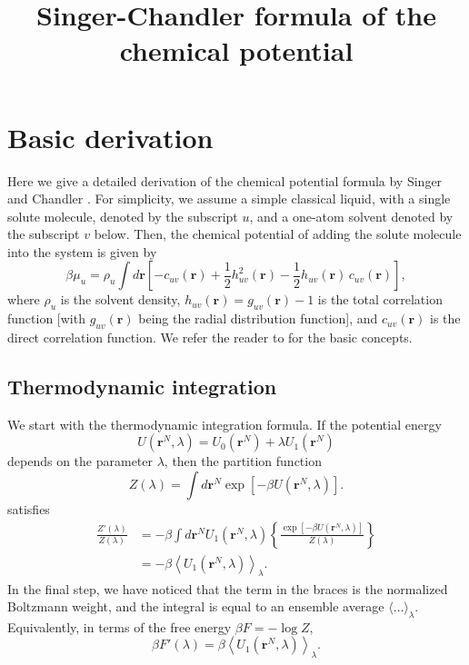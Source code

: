 \documentclass{article}
\begin{document}
\newcommand{\vct}[1]{\mathbf{#1}}
\newcommand{\vr}{\vct{r}}
\newcommand{\vrN}{\mathbf{r}^N}
\newcommand{\vrn}{\mathbf{r}^n}
\newcommand{\plam}{\partial_\lambda}



\title{Singer-Chandler formula of the chemical potential}
\date{}
\maketitle



\section{Basic derivation}

Here we give a detailed derivation of the chemical potential formula
  by Singer and Chandler \cite{singer}.
For simplicity, we assume a simple classical liquid,
  with a single solute molecule, denoted by the subscript $u$,
  and a one-atom solvent denoted by the subscript $v$ below.
Then, the chemical potential of adding the solute molecule into
  the system is given by
%
\begin{equation}
\beta \mu_u
  =
  \rho_u \int d\vr
  \left[
    - c_{uv}(\vr)
    + \frac{1}{2} h_{uv}^2(\vr)
    - \frac{1}{2} h_{uv}(\vr) \, c_{uv}(\vr)
  \right],
  \label{eq:singer}
\end{equation}
%
where $\rho_u$ is the solvent density,
  $h_{uv}(\vr) = g_{uv}(\vr) - 1$ is the total correlation function
  [with $g_{uv}(\vr)$ being the radial distribution function],
and $c_{uv}(\vr)$ is the direct correlation function.
We refer the reader to \cite{hansen}
  for the basic concepts.
%



\subsection{Thermodynamic integration}

We start with the thermodynamic integration formula.
If the potential energy
\[
  U(\vrN, \lambda) = U_0(\vrN) + \lambda U_1(\vrN)
\]
depends on the parameter $\lambda$,
then the partition function
\[
  Z(\lambda) = \int d\vrN \exp[-\beta U(\vrN, \lambda)].
\]
satisfies
\begin{align*}
  \frac{ Z'(\lambda) }{Z(\lambda)}
  &=
    -\beta \int d\vrN U_1(\vrN, \lambda)
    \left\{
      \frac{ \exp
             \left[
             -\beta U(\vrN, \lambda)
             \right]}
      { Z(\lambda) }
    \right\} \\
  &=
    -\beta
    \left\langle
      U_1(\vrN, \lambda)
    \right\rangle_\lambda.
\end{align*}
In the final step, we have noticed that the term in the braces
  is the normalized Boltzmann weight,
  and the integral is equal to an ensemble average
  $\langle \dots \rangle_\lambda$.
%
Equivalently, in terms of the free energy $\beta F = -\log Z$,
\begin{equation}
  \beta F'(\lambda)
  = \beta
    \left\langle
      U_1(\vrN, \lambda)
    \right\rangle_\lambda.
\end{equation}
\end{document}
